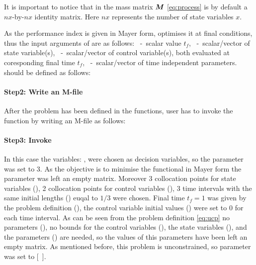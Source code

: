 {\small }

It is important to notice that in  the mass matrix
$\ve{M}$ \eqref{eq:process} is by default a $nx$-by-$nx$ identity
matrix. Here $nx$ represents the number of state variables $x$. 

As the performance index is given in Mayer form,  
optimises it at final conditions, thus the input arguments of
 are as follows: ~-~scalar value $t_{f}$,
~-~scalar/vector of state variable(s),
~-~scalar/vector of control variable(s), both evaluated at
coresponding  final time $t_{f}$, ~-~scalar/vector of time
independent parameters.  should be defined as follows:

\paragraph{Step2: Write an M-file~}

{\small }

After the problem has been defined in the functions, user has to invoke
the  function by writing an M-file  as
follows:

\paragraph{Step3: Invoke~}

{\small }

In this case the variables: ,  were chosen as
decision variables, so the parameter  was
set to 3. As the objective is to minimise the functional in Mayer form
the parameter  was left an empty
matrix. Moreover 3 collocation points for state variables
(), 2 collocation points for control
variables (), 3 time intervals with the same
initial lengths () euqal to $1/3$ were
chosen. Final time $t_f = 1$ was given by the problem definition
(), the control variable initial values
() were set to 0 for each time interval. As can
be seen from the problem definition \eqref{eq:ucp} no parameters
(), no bounds for the control variables 
(), the state variables (),
and the parameters () are needed, so the values
of this parameters have been left an empty matrix. As mentioned before,
this problem is unconstrained, so parameter 
was set to [~].

